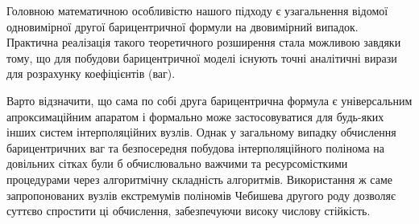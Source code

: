 Головною математичною особливістю нашого підходу є узагальнення відомої одновимірної другої барицентричної формули на двовимірний випадок. Практична реалізація такого теоретичного розширення стала можливою завдяки тому, що для побудови барицентричної моделі існують точні аналітичні вирази для розрахунку коефіцієнтів (ваг). 

Варто відзначити, що сама по собі друга барицентрична формула є універсальним апроксимаційним апаратом і формально може застосовуватися для будь-яких інших систем інтерполяційних вузлів. Однак у загальному випадку обчислення барицентричних ваг та безпосередня побудова інтерполяційного полінома на довільних сітках були б обчислювально важчими та ресурсомісткими процедурами через алгоритмічну складність алгоритмів. Використання ж саме запропонованих вузлів екстремумів поліномів Чебишева другого роду дозволяє суттєво спростити ці обчислення, забезпечуючи високу числову стійкість.